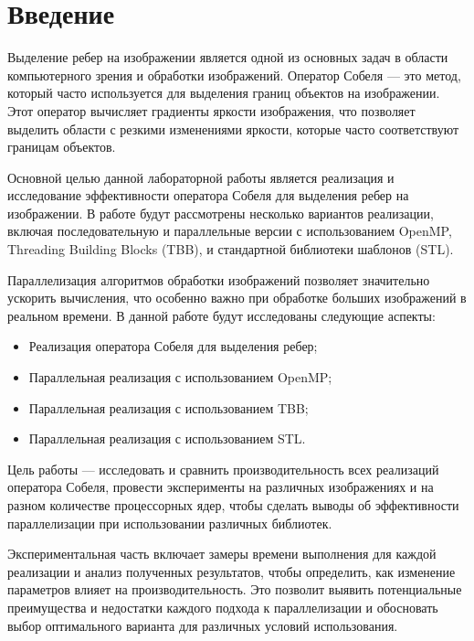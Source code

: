 \documentclass[]{article}
\theoremstyle{remark}
\theoremstyle{definition}
\begin{document}
\setcounter{page}{2}

\tableofcontents
\newpage

\section{Введение}

\par Выделение ребер на изображении является одной из основных задач в области компьютерного зрения и обработки изображений. Оператор Собеля — это метод, который часто используется для выделения границ объектов на изображении. Этот оператор вычисляет градиенты яркости изображения, что позволяет выделить области с резкими изменениями яркости, которые часто соответствуют границам объектов.

\par Основной целью данной лабораторной работы является реализация и исследование эффективности оператора Собеля для выделения ребер на изображении. В работе будут рассмотрены несколько вариантов реализации, включая последовательную и параллельные версии с использованием OpenMP, Threading Building Blocks (TBB), и стандартной библиотеки шаблонов (STL).

\par Параллелизация алгоритмов обработки изображений позволяет значительно ускорить вычисления, что особенно важно при обработке больших изображений в реальном времени. В данной работе будут исследованы следующие аспекты:

\begin{itemize}
    \item Реализация оператора Собеля для выделения ребер;
    \item Параллельная реализация с использованием OpenMP;
    \item Параллельная реализация с использованием TBB;
    \item Параллельная реализация с использованием STL.
\end{itemize}

\par Цель работы — исследовать и сравнить производительность всех реализаций оператора Собеля, провести эксперименты на различных изображениях и на разном количестве процессорных ядер, чтобы сделать выводы об эффективности параллелизации при использовании различных библиотек.

\par Экспериментальная часть включает замеры времени выполнения для каждой реализации и анализ полученных результатов, чтобы определить, как изменение параметров влияет на производительность. Это позволит выявить потенциальные преимущества и недостатки каждого подхода к параллелизации и обосновать выбор оптимального варианта для различных условий использования.
\end{document}
